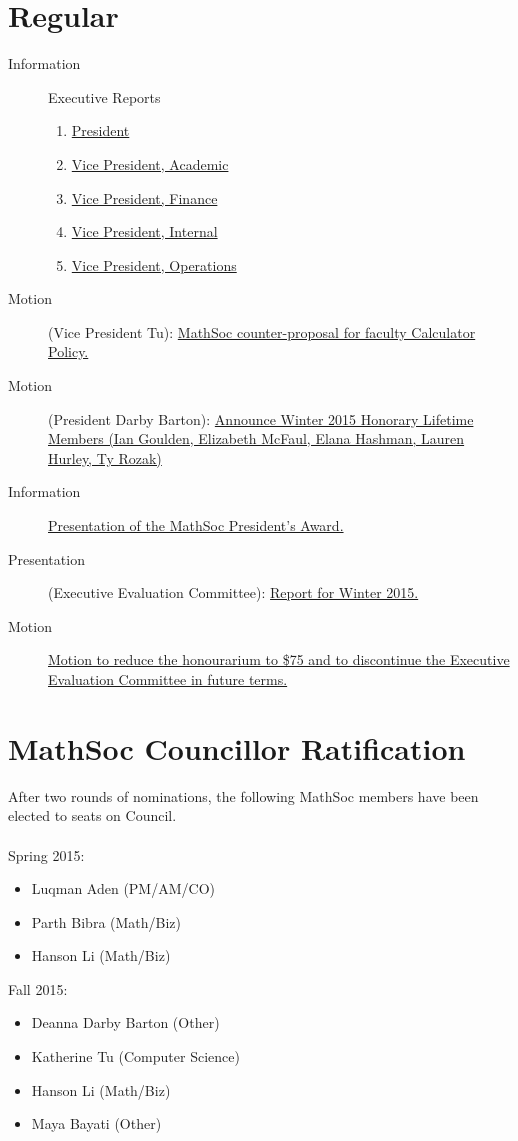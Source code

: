 \documentclass[12pt, letterpaper]{article}
\begin{document}
\section*{Regular}
\begin{description}
	\item[Information] Executive Reports
	\begin{enumerate}
		\item \hyperref[president]{President}
		\item \hyperref[vpacademic]{Vice President, Academic}
		\item \hyperref[vpfinance]{Vice President, Finance}
		\item \hyperref[vpinternal]{Vice President, Internal}
		\item \hyperref[vpoperations]{Vice President, Operations}
	\end{enumerate}
	\item[Motion] (Vice President Tu): \hyperref[calc]{MathSoc counter-proposal for faculty Calculator Policy.}
	\item[Motion] (President Darby Barton): \hyperref[hlm]{Announce Winter 2015 Honorary Lifetime Members (Ian Goulden, Elizabeth McFaul, Elana Hashman, Lauren Hurley, Ty Rozak)}
	\item[Information] \hyperref[award]{Presentation of the MathSoc President's Award.}
	\item[Presentation] (Executive Evaluation Committee): \hyperref[eec]{Report for Winter 2015.}
	\item[Motion] \hyperref[honour]{Motion to reduce the honourarium to \$75 and to discontinue the Executive Evaluation Committee in future terms.}
\end{description}
\HRule

\newpage


\newpage
{}
\section*{MathSoc Councillor Ratification}
After two rounds of nominations, the following MathSoc members have been elected to seats on Council.\\\\
Spring 2015:
\begin{itemize}
	\item Luqman Aden (PM/AM/CO)
	\item Parth Bibra (Math/Biz)
	\item Hanson Li (Math/Biz)
\end{itemize}
Fall 2015:
\begin{itemize}
	\item Deanna Darby Barton (Other)
	\item Katherine Tu (Computer Science)
	\item Hanson Li (Math/Biz)
	\item Maya Bayati (Other)
\end{itemize}
\end{document}
